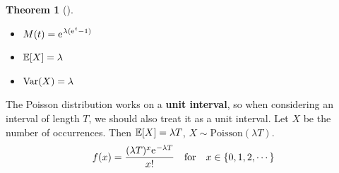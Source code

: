 \documentclass[10pt,UTF8]{article}
\newenvironment{definition box}
{\begin{tcolorbox}[colback=blue!5!white,colframe=blue!75!black,parbox=false,before upper=\par,before lower=\par]}
{\end{tcolorbox}}
\newenvironment{theorem box}
{\begin{tcolorbox}[colback=yellow!5!white,colframe=yellow!75!black,parbox=false,before upper=\par,before lower=\par]}
{\end{tcolorbox}}
\theoremstyle{definition}
\newtheorem{definition inner}{Definition}[section]
\theoremstyle{plain}
\newtheorem{theorem inner}{Theorem}[section]
\newenvironment{theorem}[1][]
{\begin{theorem box}\begin{theorem inner}[#1]\hfill\par}
{\end{theorem inner}\end{theorem box}}
\theoremstyle{definition}
\newtheorem*{proof inner}{\textit{Proof}}
\theoremstyle{remark}
\newcommand{\e}{\mathrm{e}{\mkern 1 mu}}
\newcommand{\E}[1]{\mathbb{E}\qty[#1]}  %
\newcommand{\Var}[1]{\mathrm{Var}\qty(#1)}  %
\begin{document}
\begin{theorem}
    \begin{itemize}
        \item $\displaystyle M(t) = \e^{\lambda (\e^t - 1)}$
        \item $\displaystyle \E{X} = \lambda$
        \item $\displaystyle \Var{X} = \lambda$
    \end{itemize}
\end{theorem}

The Poisson distribution works on a \textbf{unit interval},
so when considering an interval of length $T$,
we should also treat it as a unit interval.
Let $X$ be the number of occurrences.
Then $\E{X} = \lambda T$, $X\sim \mathrm{Poisson}(\lambda T)$.
\begin{equation*}
    f(x) = \frac{(\lambda T)^x \e^{-\lambda T}}{x!}
    \qfor x\in\{0,1,2,\cdots\}
\end{equation*}
\end{document}
